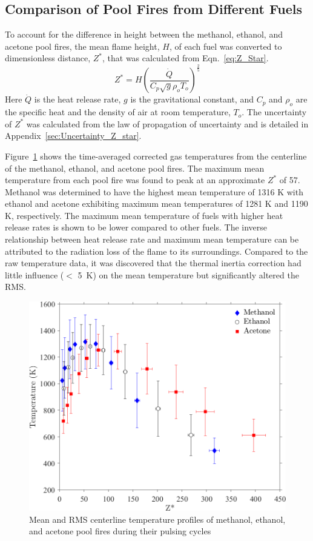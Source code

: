 \documentclass[12pt]{article}
\begin{document}
\subsection{Comparison of Pool Fires from Different Fuels}
\label{ssec:Fuel_comp}
To account for the difference in height between the methanol, ethanol, and acetone pool fires, the mean flame height, $H$, of each fuel was converted to dimensionless distance, $Z^{*}$, that was calculated from Eqn.~\ref{eq:Z_Star}.
\begin{equation}\label{eq:Z_Star}
Z^{*}=H\left(\frac{\dot{Q}}{C_{p}\sqrt{g}\rho_{o}T_{o}}\right)^{\frac{2}{5}}
\end{equation} 
Here $\dot{Q}$ is the heat release rate, $g$ is the gravitational constant, and $C_p$ and $\rho_o$ are the specific heat and the density of air at room temperature, $T_o$. The uncertainty of $Z^{*}$ was calculated from the law of propagation of uncertainty and is detailed in Appendix~\ref{sec:Uncertainty_Z_star}.

Figure~\ref{fig:Temp_Comparison} shows the time-averaged corrected gas temperatures from the centerline of the methanol, ethanol, and acetone pool fires. The maximum mean temperature from each pool fire was found to peak at an approximate $Z^{*}$ of 57. Methanol was determined to have the highest mean temperature of 1316 K with ethanol and acetone exhibiting maximum mean temperatures of 1281 K and 1190 K, respectively. The maximum mean temperature of fuels with higher heat release rates is shown to be lower compared to other fuels. The inverse relationship between heat release rate and maximum mean temperature can be attributed to the radiation loss of the flame to its surroundings. Compared to the raw temperature data, it was discovered that the thermal inertia correction had little influence ($<$ \SI{5}{K}) on the mean temperature but significantly altered the RMS.

\begin{figure}[h!]
	\centering
\includegraphics[width=11.0 cm, keepaspectratio]{Temperature_Comparison.png}
	\caption[Major Species Comparison]{Mean and RMS centerline temperature profiles of methanol, ethanol, and acetone pool fires during their pulsing cycles}
	\label{fig:Temp_Comparison}
\end{figure}
\end{document}

